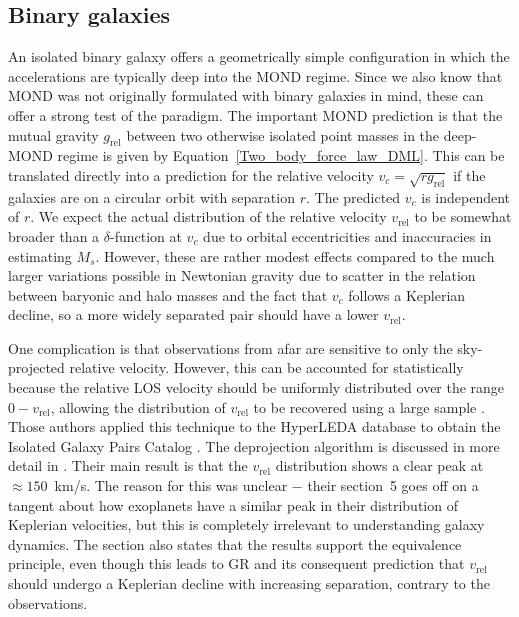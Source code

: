 \documentclass[fleqn,usenatbib,useAMS,onecolumn]{mnras} %
\begin{document}
\subsection{Binary galaxies}
\label{Binary_galaxies}

An isolated binary galaxy offers a geometrically simple configuration in which the accelerations are typically deep into the MOND regime. Since we also know that MOND was not originally formulated with binary galaxies in mind, these can offer a strong test of the paradigm. The important MOND prediction is that the mutual gravity $g_\text{rel}$ between two otherwise isolated point masses in the deep-MOND regime is given by Equation~\ref{Two_body_force_law_DML}. This can be translated directly into a prediction for the relative velocity $v_c = \sqrt{r g_\text{rel}}$ if the galaxies are on a circular orbit with separation $r$. The predicted $v_c$ is independent of $r$. We expect the actual distribution of the relative velocity $v_{\text{rel}}$ to be somewhat broader than a $\delta$-function at $v_c$ due to orbital eccentricities and inaccuracies in estimating $M_s$. However, these are rather modest effects compared to the much larger variations possible in Newtonian gravity due to scatter in the relation between baryonic and halo masses and the fact that $v_c$ follows a Keplerian decline, so a more widely separated pair should have a lower $v_{\text{rel}}$.

One complication is that observations from afar are sensitive to only the sky-projected relative velocity. However, this can be accounted for statistically because the relative LOS velocity should be uniformly distributed over the range $0-v_{\text{rel}}$, allowing the distribution of $v_{\text{rel}}$ to be recovered using a large sample \citep{Nottale_2018_method}. Those authors applied this technique to the HyperLEDA database \citep{Makarov_2014} to obtain the Isolated Galaxy Pairs Catalog \citep[IGPC;][]{Nottale_2018_catalogue}. The deprojection algorithm is discussed in more detail in \citet{Nottale_2020}. Their main result is that the $v_{\text{rel}}$ distribution shows a clear peak at $\approx 150$~km/s. The reason for this was unclear $-$ their section~5 goes off on a tangent about how exoplanets have a similar peak in their distribution of Keplerian velocities, but this is completely irrelevant to understanding galaxy dynamics. The section also states that the results support the equivalence principle, even though this leads to GR and its consequent prediction that $v_{\text{rel}}$ should undergo a Keplerian decline with increasing separation, contrary to the observations.
\end{document}
